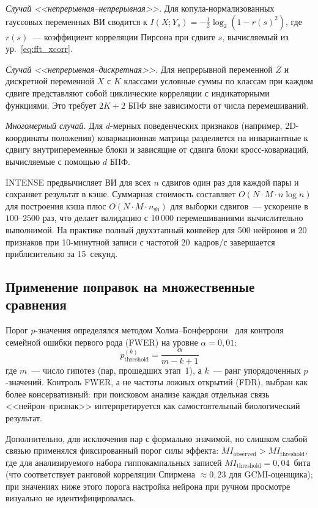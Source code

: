 \textit{Случай <<непрерывная--непрерывная>>.} Для копула-нормализованных гауссовых переменных ВИ сводится к $I(X; Y_s) = -\tfrac{1}{2}\log_2(1 - r(s)^2)$, где $r(s)$~--- коэффициент корреляции Пирсона при сдвиге $s$, вычисляемый из ур.~\eqref{eq:fft_xcorr}.

\textit{Случай <<непрерывная--дискретная>>.} Для непрерывной переменной $Z$ и дискретной переменной $X$ с $K$ классами условные суммы по классам при каждом сдвиге представляют собой циклические корреляции с индикаторными функциями. Это требует $2K+2$ БПФ вне зависимости от числа перемешиваний.

\textit{Многомерный случай.} Для $d$-мерных поведенческих признаков (например, 2D-координаты положения) ковариационная матрица разделяется на инвариантные к сдвигу внутрипеременные блоки и зависящие от сдвига блоки кросс-ковариаций, вычисляемые с помощью $d$ БПФ.

INTENSE предвычисляет ВИ для всех $n$ сдвигов один раз для каждой пары и сохраняет результат в кэше. Суммарная стоимость составляет $O(N \cdot M \cdot n \log n)$ для построения кэша плюс $O(N \cdot M \cdot n_{\text{sh}})$ для выборки сдвигов~--- ускорение в $100$--$2500$ раз, что делает валидацию с 10\,000 перемешиваниями вычислительно выполнимой. На практике полный двухэтапный конвейер для 500 нейронов и 20 признаков при 10-минутной записи с частотой 20~кадров/с завершается приблизительно за 15~секунд.


\subsection{Применение поправок на множественные сравнения}\label{sec:intense_mc}

Порог $p$-значения определялся методом Холма--Бонферрони~\cite{Holm1979} для контроля семейной ошибки первого рода (FWER) на уровне $\alpha = 0{,}01$:
$$p_{\text{threshold}}^{(k)} = \frac{\alpha}{m - k + 1}$$
где $m$~--- число гипотез (пар, прошедших этап~1), а $k$~--- ранг упорядоченных $p$-значений. Контроль FWER, а не частоты ложных открытий (FDR), выбран как более консервативный: при поисковом анализе каждая отдельная связь <<нейрон--признак>> интерпретируется как самостоятельный биологический результат.

Дополнительно, для исключения пар с формально значимой, но слишком слабой связью применялся фиксированный порог силы эффекта: $MI_{\text{observed}} > MI_{\text{threshold}}$, где для анализируемого набора гиппокампальных записей $MI_{\text{threshold}} = 0{,}04$~бита (что соответствует ранговой корреляции Спирмена $\approx 0{,}23$ для GCMI-оценщика); при значениях ниже этого порога настройка нейрона при ручном просмотре визуально не идентифицировалась.

